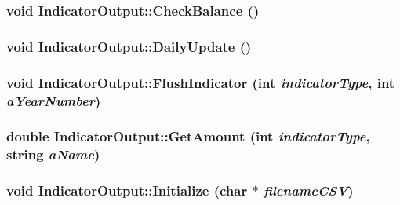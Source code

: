 \label{class_indicator_output_a1a631aa0f783160f5c12f0ad12e67c37}
\hypertarget{class_indicator_output_a457faed0a5693358f7c0eb9db2d8dc4b}{
\subsubsection[{CheckBalance}]{\setlength{\rightskip}{0pt plus 5cm}void IndicatorOutput::CheckBalance ()}}
\label{class_indicator_output_a457faed0a5693358f7c0eb9db2d8dc4b}
\hypertarget{class_indicator_output_a15264189fefc34768726420283bd1ebc}{
\subsubsection[{DailyUpdate}]{\setlength{\rightskip}{0pt plus 5cm}void IndicatorOutput::DailyUpdate ()}}
\label{class_indicator_output_a15264189fefc34768726420283bd1ebc}
\hypertarget{class_indicator_output_abd79068b0443ed1c4eb43c5f88664111}{
\subsubsection[{FlushIndicator}]{\setlength{\rightskip}{0pt plus 5cm}void IndicatorOutput::FlushIndicator (int {\em indicatorType}, \/  int {\em aYearNumber})}}
\label{class_indicator_output_abd79068b0443ed1c4eb43c5f88664111}
\hypertarget{class_indicator_output_a129e8b80f7102730a2103b879c486168}{
\subsubsection[{GetAmount}]{\setlength{\rightskip}{0pt plus 5cm}double IndicatorOutput::GetAmount (int {\em indicatorType}, \/  string {\em aName})}}
\label{class_indicator_output_a129e8b80f7102730a2103b879c486168}
\hypertarget{class_indicator_output_a580f364c5b0f365955f47a44fac302e3}{
\subsubsection[{Initialize}]{\setlength{\rightskip}{0pt plus 5cm}void IndicatorOutput::Initialize (char $\ast$ {\em filenameCSV})}}
